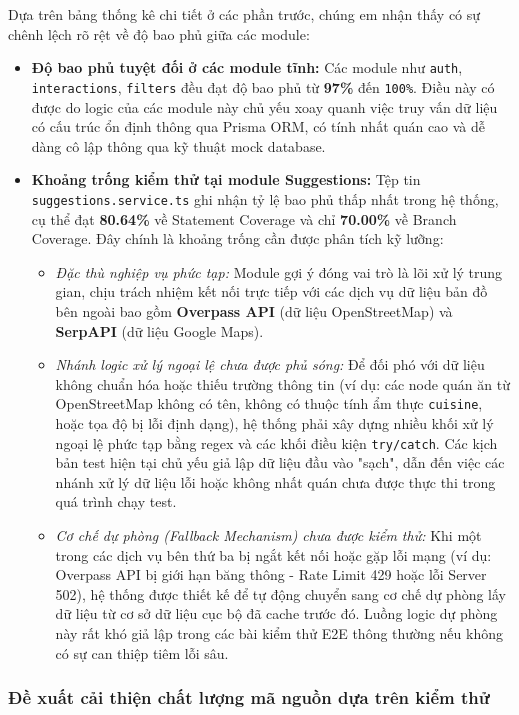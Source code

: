 Dựa trên bảng thống kê chi tiết ở các phần trước, chúng em nhận thấy có sự chênh lệch rõ rệt về độ bao phủ giữa các module:
\begin{itemize}
    \item \textbf{Độ bao phủ tuyệt đối ở các module tĩnh:} Các module như \texttt{auth}, \texttt{interactions}, \texttt{filters} đều đạt độ bao phủ từ \textbf{97\%} đến \texttt{100\%}. Điều này có được do logic của các module này chủ yếu xoay quanh việc truy vấn dữ liệu có cấu trúc ổn định thông qua Prisma ORM, có tính nhất quán cao và dễ dàng cô lập thông qua kỹ thuật mock database.
    \item   \textbf{Khoảng trống kiểm thử tại module Suggestions:} Tệp tin \texttt{suggestions.service.ts} ghi nhận tỷ lệ bao phủ thấp nhất trong hệ thống, cụ thể đạt \textbf{80.64\%} về Statement Coverage và chỉ \textbf{70.00\%} về Branch Coverage. Đây chính là khoảng trống cần được phân tích kỹ lưỡng:
    \begin{itemize}
        \item \textit{Đặc thù nghiệp vụ phức tạp:} Module gợi ý đóng vai trò là lõi xử lý trung gian, chịu trách nhiệm kết nối trực tiếp với các dịch vụ dữ liệu bản đồ bên ngoài bao gồm \textbf{Overpass API} (dữ liệu OpenStreetMap) và \textbf{SerpAPI} (dữ liệu Google Maps).
        \item \textit{Nhánh logic xử lý ngoại lệ chưa được phủ sóng:} Để đối phó với dữ liệu không chuẩn hóa hoặc thiếu trường thông tin (ví dụ: các node quán ăn từ OpenStreetMap không có tên, không có thuộc tính ẩm thực \texttt{cuisine}, hoặc tọa độ bị lỗi định dạng), hệ thống phải xây dựng nhiều khối xử lý ngoại lệ phức tạp bằng regex và các khối điều kiện \texttt{try/catch}. Các kịch bản test hiện tại chủ yếu giả lập dữ liệu đầu vào "sạch", dẫn đến việc các nhánh xử lý dữ liệu lỗi hoặc không nhất quán chưa được thực thi trong quá trình chạy test.
        \item \textit{Cơ chế dự phòng (Fallback Mechanism) chưa được kiểm thử:} Khi một trong các dịch vụ bên thứ ba bị ngắt kết nối hoặc gặp lỗi mạng (ví dụ: Overpass API bị giới hạn băng thông - Rate Limit 429 hoặc lỗi Server 502), hệ thống được thiết kế để tự động chuyển sang cơ chế dự phòng lấy dữ liệu từ cơ sở dữ liệu cục bộ đã cache trước đó. Luồng logic dự phòng này rất khó giả lập trong các bài kiểm thử E2E thông thường nếu không có sự can thiệp tiêm lỗi sâu.
    \end{itemize}
\end{itemize}

\subsubsection{Đề xuất cải thiện chất lượng mã nguồn dựa trên kiểm thử}

